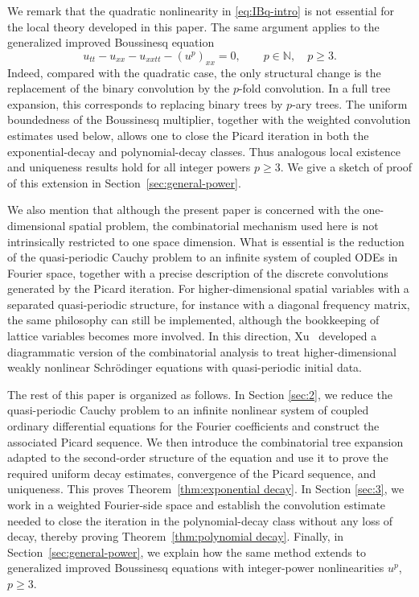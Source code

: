 \documentclass[12pt,reqno,tbtags]{amsart}
\newcommand\1{\mathbbm{1}}
\begin{document}
We remark that the quadratic nonlinearity in \eqref{eq:IBq-intro} is not essential
for the local theory developed in this paper. The same argument applies to the
generalized improved Boussinesq equation
\[
    u_{tt}-u_{xx}-u_{xxtt}-(u^p)_{xx}=0,
    \qquad p\in\mathbb N,\quad p\ge3.
\]
Indeed, compared with the quadratic case, the only structural change is the replacement of
the binary convolution by the $p$-fold convolution. In a full tree expansion, this
corresponds to replacing binary trees by $p$-ary trees. The uniform boundedness of the
Boussinesq multiplier, together with the weighted convolution estimates used below,
allows one to close the Picard iteration in both the exponential-decay and
polynomial-decay classes. Thus analogous local existence and uniqueness results hold
for all integer powers $p\ge3$. We give a sketch of proof of  this extension in
Section~\ref{sec:general-power}.


We also mention that although the present paper is concerned with the one-dimensional spatial problem,
the combinatorial mechanism used here is not intrinsically restricted to one space
dimension. What is essential is the reduction of the quasi-periodic Cauchy problem
to an infinite system of coupled ODEs in Fourier space, together with a precise
description of the discrete convolutions generated by the Picard iteration. For
higher-dimensional spatial variables with a separated quasi-periodic structure, for
instance with a diagonal frequency matrix,
the same philosophy can still be implemented, although the bookkeeping of lattice
variables becomes more involved. In this direction, Xu~\cite{Xu25} developed a
diagrammatic version of the combinatorial analysis to treat higher-dimensional
weakly nonlinear Schr\"odinger equations with quasi-periodic initial data.

The rest of this paper is organized as follows. In Section \ref{sec:2}, we reduce the
quasi-periodic Cauchy problem to an infinite nonlinear system of coupled ordinary
differential equations for the Fourier coefficients and construct the associated
Picard sequence. We then introduce the combinatorial tree expansion adapted to the
second-order structure of the equation and use it to prove the required uniform
decay estimates, convergence of the Picard sequence, and uniqueness. This proves
Theorem~\ref{thm:exponential decay}. In Section \ref{sec:3}, we work in a weighted Fourier-side space
and establish the convolution estimate needed to close the iteration in the
polynomial-decay class without any loss of decay, thereby proving
Theorem~\ref{thm:polynomial decay}. Finally, in Section~\ref{sec:general-power},
we explain how the same method extends to generalized improved Boussinesq equations
with integer-power nonlinearities $u^p$, $p\geq 3$.
\end{document}

